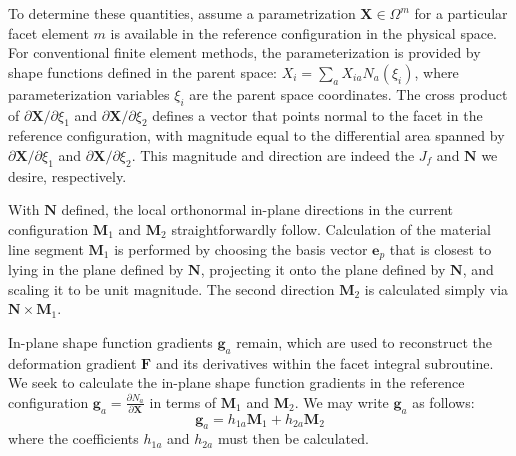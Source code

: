 To determine these quantities, assume a parametrization $\bm{X} \in \Omega^m$ for a particular facet element $m$ is available in the reference configuration in the physical space. For conventional finite element methods, the parameterization is provided by shape functions defined in the parent space: ${X}_{i} = \sum\limits_{a}{X}_{ia}{N}_a(\xi_i)$, where parameterization variables $\xi_i$ are the parent space coordinates. The cross product of ${\partial{\bm {X}}}/{\partial \xi_1}$ and ${\partial{\bm {X}}}/{\partial \xi_2}$ defines a vector that points normal to the facet in the reference configuration, with magnitude equal to the differential area spanned by ${\partial{\bm {X}}}/{\partial \xi_1}$ and ${\partial{\bm {X}}}/{\partial \xi_2}$. This magnitude and direction are indeed the $J_f$ and ${\bm {N}}$ we desire, respectively.

With $\bm{N}$ defined, the local orthonormal in-plane directions in the current configuration $\bm{M}_1$ and $\bm{M}_2$ straightforwardly follow. Calculation of the material line segment ${\bm {M}}_1$ is performed by choosing the basis vector ${\bm {e}}_p$ that is closest to lying in the plane defined by ${\bm N}$, projecting it onto the plane defined by $\bm{N}$, and scaling it to be unit magnitude. The second direction ${\bm M}_2$ is calculated simply via ${\bm {N}} \times {\bm {M}}_1$.

In-plane shape function gradients $\bm{g}_a$ remain, which are used to reconstruct the deformation gradient $\bm{F}$ and its derivatives within the facet integral subroutine. We seek to calculate the in-plane shape function gradients in the reference configuration $\bm{g}_a = \frac{\partial N_a}{\partial \bm{X}}$ in terms of $\bm{M}_1$ and $\bm{M}_2$. We may write $\bm{g}_a$ as follows:
\begin{equation}
{\bm {g}}_a = {h_{1a}}{\bm {M}}_1 + {h_{2a}}{\bm {M}}_2
\end{equation}
where the coefficients $h_{1a}$ and $h_{2a}$ must then be calculated.

